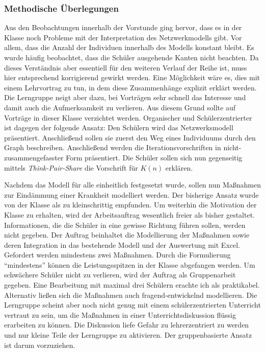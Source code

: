 \subsubsection*{Methodische Überlegungen}
Aus den Beobachtungen innerhalb der Vorstunde ging hervor, dass es in der Klasse noch Probleme mit der Interpretation des Netzwerkmodells gibt. Vor allem, dass die Anzahl der Individuen innerhalb des Modells konstant bleibt. Es wurde häufig beobachtet, dass die Schüler ausgehende Kanten nicht beachten. Da dieses Verständnis aber essentiell für den weiteren Verlauf der Reihe ist, muss hier entsprechend korrigierend gewirkt werden. Eine Möglichkeit wäre es, dies mit einem Lehrvortrag zu tun, in dem diese Zusammenhänge explizit erklärt werden. Die Lerngruppe neigt aber dazu, bei Vorträgen sehr schnell das Interesse und damit auch die Aufmerksamkeit zu verlieren. Aus diesem Grund sollte auf Vorträge in dieser Klasse verzichtet werden. Organischer und Schülerzentrierter ist dagegen der folgende Ansatz: Den Schülern wird das Netzwerksmodell präsentiert. Anschließend sollen sie zuerst den Weg eines Individuums durch den Graph beschreiben. Anschließend werden die Iterationsvorschriften in nicht-zusammengefasster Form präsentiert. Die Schüler sollen sich nun gegenseitig mittels \emph{Think-Pair-Share} die Vorschrift für $K(n)$ erklären. 

Nachdem das Modell für alle einheitlich festgesetzt wurde, sollen nun Maßnahmen zur Eindämmung einer Krankheit modelliert werden. Der bisherige Ansatz wurde von der Klasse als zu kleinschrittig empfunden. Um weiterhin die Motivation der Klasse zu erhalten, wird der Arbeitsauftrag wesentlich freier als bisher gestaltet. Informationen, die die Schüler in eine gewisse Richtung führen sollen, werden nicht gegeben. Der Auftrag beinhaltet die Modellierung der Maßnahmen sowie deren Integration in das bestehende Modell und der Auswertung mit Excel. Gefordert werden mindestens zwei Maßnahmen. Durch die Formulierung ``mindestens'' können die Leistungsspitzen in der Klasse abgefangen werden. Um schwächere Schüler nicht zu verlieren, wird der Auftrag als Gruppenarbeit gegeben. Eine Bearbeitung mit maximal drei Schülern erachte ich als praktikabel. Alternativ ließen sich die Maßnahmen auch fragend-entwickelnd modellieren. Die Lerngruppe scheint aber noch nicht genug mit einem schülerzentrierten Unterricht vertraut zu sein, um die Maßnahmen in einer Unterrichtsdiskussion flüssig erarbeiten zu können. Die Diskussion liefe Gefahr zu lehrerzentriert zu werden und nur kleine Teile der Lerngruppe zu aktivieren. Der gruppenbasierte Ansatz ist darum vorzuziehen.

